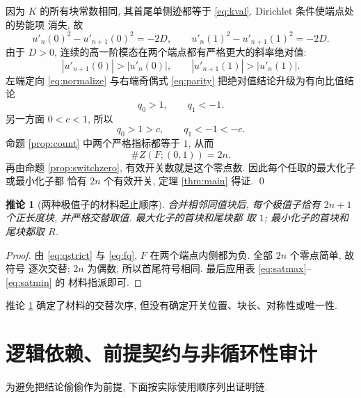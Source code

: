 \documentclass[UTF8]{ctexart}
\newtheorem{corollary}[theorem]{推论}
\begin{document}
因为 $K$ 的所有块常数相同, 其首尾单侧迹都等于 \eqref{eq:kval}. Dirichlet 条件使端点处的势能项
消失, 故
\begin{equation}
	u'_n(0)^2-u'_{n+1}(0)^2=-2D,\qquad
	u'_n(1)^2-u'_{n+1}(1)^2=-2D .
	\label{eq:endpoint}
\end{equation}
由于 $D>0$, 连续的高一阶模态在两个端点都有严格更大的斜率绝对值:
\begin{equation}
	|u'_{n+1}(0)|>|u'_n(0)|,\qquad |u'_{n+1}(1)|>|u'_n(1)| .
	\label{eq:abs}
\end{equation}
左端定向 \eqref{eq:normalize} 与右端奇偶式 \eqref{eq:parity} 把绝对值结论升级为有向比值结论
\begin{equation}
	q_0>1,\qquad q_1<-1 .
	\label{eq:qstrict}
\end{equation}
另一方面 $0<c<1$, 所以
\begin{equation*}
	q_0>1>c,\qquad q_1<-1<-c .
\end{equation*}
命题 \ref{prop:count} 中两个严格指标都等于 $1$, 从而
\begin{equation}
	\#Z(F;(0,1))=2n .
	\label{eq:finalcount}
\end{equation}
再由命题 \ref{prop:switchzero}, 有效开关数就是这个零点数. 因此每个任取的最大化子或最小化子都
恰有 $2n$ 个有效开关, 定理 \ref{thm:main} 得证. \qed

\begin{corollary}[两种极值子的材料起止顺序]\label{cor:materials}
合并相邻同值块后, 每个极值子恰有 $2n+1$ 个正长度块, 并严格交替取值. 最大化子的首块和尾块都
取 $1$; 最小化子的首块和尾块都取 $R$.
\end{corollary}

\begin{proof}
由 \eqref{eq:qstrict} 与 \eqref{eq:fq}, $F$ 在两个端点内侧都为负. 全部 $2n$ 个零点简单, 故符号
逐次交替; $2n$ 为偶数, 所以首尾符号相同. 最后应用表 \eqref{eq:satmax}--\eqref{eq:satmin} 的
材料指派即可.
\end{proof}

推论 \ref{cor:materials} 确定了材料的交替次序, 但没有确定开关位置、块长、对称性或唯一性.

\section{逻辑依赖、前提契约与非循环性审计}

为避免把结论偷偷作为前提, 下面按实际使用顺序列出证明链.
\end{document}
